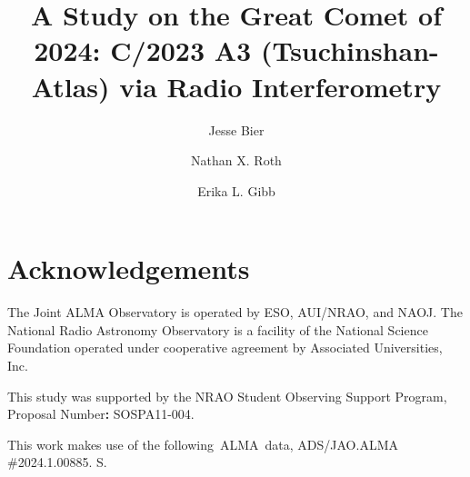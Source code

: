 \documentclass[]{aastex7}
\begin{document}
\title{A Study on the Great Comet of 2024: C/2023 A3 (Tsuchinshan-Atlas) via Radio Interferometry}

\newcommand{\jjb}[1]{\textcolor{teal}{{\scriptsize JJB:} #1}}
\newcommand{\nxr}[1]{\textcolor{red}{{\scriptsize NXR:} #1}}
\newcommand{\gibb}[1]{\textcolor{blue}{{\scriptsize Gibb:} #1}}

\newcommand{\vdag}{(v)^\dagger}
\newcommand{\aastex}{AAS\TeX}
\newcommand{\latex}{La\TeX}
\newcommand{\subs}[1]{\textsubscript{#1}}
\newcommand{\sups}[1]{\textsuperscript{#1}}
\newcommand{\rh}[1]{\textcolor{black}{{\textit{r}\subs{H}}#1}}
\newcommand{\qwater}[1]{\textcolor{black}{{\textit{Q}\subs{H2O}}#1}}
\newcommand{\fmrad}[1]{\textcolor{black}{{FoM\subs{mm}}#1}}
\newcommand{\fmir}[1]{\textcolor{black}{{FoM\subs{IR}}#1}}
\newcommand{\trot}[1]{\textcolor{black}{{\textit{T}\subs{rot}}#1}}
\newcommand{\Ju}[1]{\textcolor{black}{{\textit{J}}#1}}
\newcommand{\ie}[1]{\textcolor{black}{{\textit{i.e.,}}#1}}
\newcommand{\eg}[1]{\textcolor{black}{{\textit{e.g.,}}#1}}
\newcommand{\tkin}[1]{\textcolor{black}{{\textit{T}\subs{kin}}#1}}
\newcommand{\vexp}[1]{\textcolor{black}{{\textit{v}\subs{exp}}#1}}
\newcommand{\kms}[1]{\textcolor{black}{{km\,s\(^{-1}\)}#1}}
\newcommand{\ps}[1]{\textcolor{black}{{s\(^{-1}\)}#1}}


\author[0009-0000-5943-3124]{Jesse Bier}

\author[0000-0002-6006-9574]{Nathan X. Roth}

\author[0000-0003-0142-5265]{Erika L. Gibb}







\section{Acknowledgements}\label{acknowledgements}

The Joint ALMA Observatory is operated by ESO, AUI/NRAO, and NAOJ. The National Radio Astronomy Observatory is a facility of the National Science Foundation operated under cooperative agreement by Associated Universities, Inc.

This study was supported by the NRAO Student Observing Support Program, Proposal Number\textbf{:} SOSPA11-004.

This work makes use of the following~ALMA~data, ADS/JAO.ALMA \#2024.1.00885. S.



\end{document}
